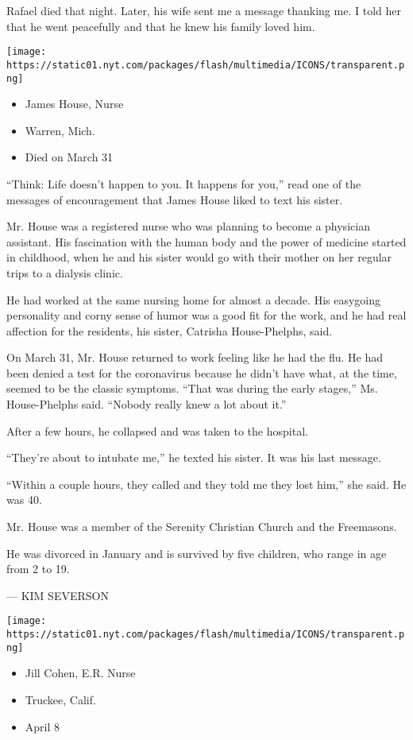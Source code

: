 Rafael died that night. Later, his wife sent me a message thanking me. I
told her that he went peacefully and that he knew his family loved him.

\texttt{[image: https://static01.nyt.com/packages/flash/multimedia/ICONS/transparent.png]}

\begin{itemize}
\tightlist
\item
  James House, Nurse
\item
  Warren, Mich.
\item
  Died on March 31
\end{itemize}

``Think: Life doesn't happen to you. It happens for you,'' read one of
the messages of encouragement that James House liked to text his sister.

Mr. House was a registered nurse who was planning to become a physician
assistant. His fascination with the human body and the power of medicine
started in childhood, when he and his sister would go with their mother
on her regular trips to a dialysis clinic.

He had worked at the same nursing home for almost a decade. His
easygoing personality and corny sense of humor was a good fit for the
work, and he had real affection for the residents, his sister, Catrisha
House-Phelphs, said.

On March 31, Mr. House returned to work feeling like he had the flu. He
had been denied a test for the coronavirus because he didn't have what,
at the time, seemed to be the classic symptoms. ``That was during the
early stages,'' Ms. House-Phelphs said. ``Nobody really knew a lot about
it.''

After a few hours, he collapsed and was taken to the hospital.

``They're about to intubate me,'' he texted his sister. It was his last
message.

``Within a couple hours, they called and they told me they lost him,''
she said. He was 40.

Mr. House was a member of the Serenity Christian Church and the
Freemasons.

He was divorced in January and is survived by five children, who range
in age from 2 to 19.

--- KIM SEVERSON

\texttt{[image: https://static01.nyt.com/packages/flash/multimedia/ICONS/transparent.png]}

\begin{itemize}
\tightlist
\item
  Jill Cohen, E.R. Nurse
\item
  Truckee, Calif.
\item
  April 8
\end{itemize}

